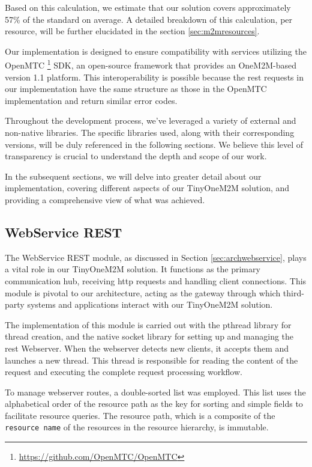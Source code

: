 \documentclass[a4paper,fleqn]{cas-dc}
\begin{document}
Based on this calculation, we estimate that our solution covers approximately 57\% of the standard on average. A detailed breakdown of this calculation, per resource, will be further elucidated in the section \ref{sec:m2mresources}.

Our implementation is designed to ensure compatibility with services utilizing the OpenMTC \footnote{\url{https://github.com/OpenMTC/OpenMTC}} SDK, an open-source framework that provides an OneM2M-based version 1.1 platform. This interoperability is possible because the \gls{rest} requests in our implementation have the same structure as those in the OpenMTC implementation and return similar error codes.

Throughout the development process, we've leveraged a variety of external and non-native libraries. The specific libraries used, along with their corresponding versions, will be duly referenced in the following sections. We believe this level of transparency is crucial to understand the depth and scope of our work.

In the subsequent sections, we will delve into greater detail about our implementation, covering different aspects of our TinyOneM2M solution, and providing a comprehensive view of what was achieved.

\subsection{WebService REST}

The WebService REST module, as discussed in Section \ref{sec:archwebservice}, plays a vital role in our TinyOneM2M solution. It functions as the primary communication hub, receiving \gls{http} requests and handling client connections. This module is pivotal to our architecture, acting as the gateway through which third-party systems and applications interact with our TinyOneM2M solution.

The implementation of this module is carried out with the pthread library for thread creation, and the native socket library for setting up and managing the \gls{rest} Webserver. When the webserver detects new clients, it accepts them and launches a new thread. This thread is responsible for reading the content of the request and executing the complete request processing workflow.

To manage webserver routes, a double-sorted list was employed. This list uses the alphabetical order of the resource path as the key for sorting and simple fields to facilitate resource queries. The resource path, which is a composite of the \texttt{resource name} of the resources in the resource hierarchy, is immutable.
\end{document}
